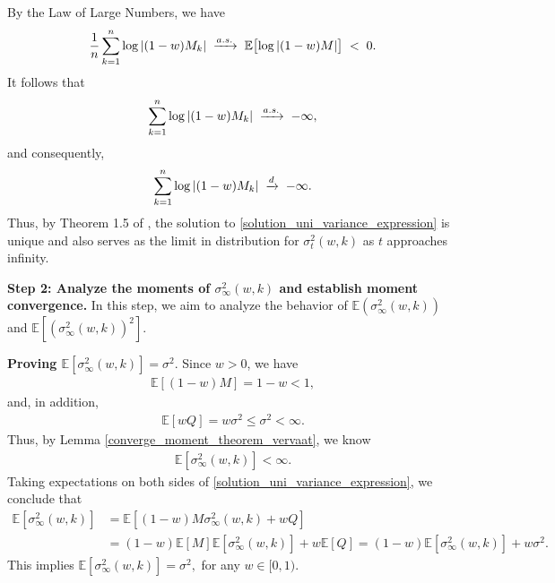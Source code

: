 \bigskip

By the Law of Large Numbers, we have
\[
\frac{1}{n}\sum_{k=1}^{n} \log \left\lvert (1-w)M_k\right\rvert
\;\xrightarrow{a.s.}\;
\mathbb{E}\bigl[\log \left\lvert (1-w)M\right\rvert\bigr]
\;<\;
0.
\]
It follows that
\[
\sum_{k=1}^{n} \log \left\lvert (1-w)M_k\right\rvert
\;\xrightarrow{a.s.}\;
-\infty,
\]
and consequently,
\[
\sum_{k=1}^{n}\log \left\lvert (1-w)M_k\right\rvert
\;\xrightarrow{d}\;
-\infty.
\]
Thus, by Theorem 1.5 of \citep{vervaat1979stochastic}, the solution to \eqref{solution_uni_variance_expression} is unique and also serves as the limit in distribution for \(\sigma_t^2(w,k)\) as $t$ approaches infinity.

\noindent
\textbf{Step 2: Analyze the moments of \(\sigma_\infty^2(w,k)\) and establish moment convergence.} In this step, we aim to analyze the behavior of $\mathbb{E}(\sigma_\infty^2(w,k))$ and $\mathbb{E}[(\sigma_\infty^2(w,k))^2]$.


\textbf{Proving $\mathbb{E}[\sigma_{\infty}^2(w,k)] = \sigma^2$}. Since \(w > 0\), we have
\begin{align}
\mathbb{E}[(1-w)M] = 1-w < 1,
\end{align}
and, in addition,
\begin{align}
\mathbb{E}[wQ] = w\sigma^2 \leq \sigma^2 < \infty.
\end{align}
Thus, by Lemma \ref{converge_moment_theorem_vervaat}, we know 
\begin{align}
\mathbb{E}[\sigma_{\infty}^2(w,k)] < \infty.
\end{align}
Taking expectations on both sides of \eqref{solution_uni_variance_expression}, we conclude that 
\begin{align*}
\mathbb{E}[\sigma_{\infty}^2(w,k)] &= \mathbb{E}[(1-w)M\sigma_{\infty}^2(w,k) + wQ] \\&= (1-w)\mathbb{E}[M]\mathbb{E}[\sigma_{\infty}^2(w,k)] + w\mathbb{E}[Q] = (1-w)\mathbb{E}[\sigma_{\infty}^2(w,k)] + w\sigma^2.
\end{align*}
This implies $\mathbb{E}[\sigma_{\infty}^2(w,k)] = \sigma^2,
$ for any $w \in [0,1)$.


